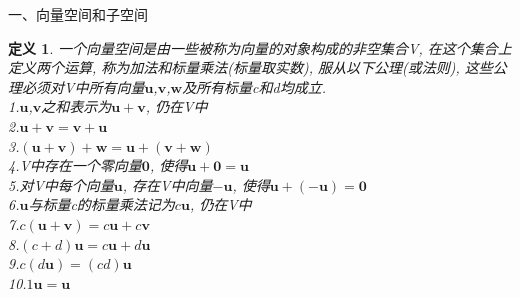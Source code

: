 \documentclass[UTF8, fontset=ubuntu]{ctexart}
\theoremstyle{nonumberplain}
\newtheorem{definition}{定义}
\theoremstyle{plain}
\begin{document}
一、向量空间和子空间\\[-3ex]
\begin{definition}
一个向量空间是由一些被称为向量的对象构成的非空集合V, 在这个集合上定义两个运算, 称为加法和标量乘法(标量取实数), 服从以下公理(或法则), 这些公理必须对V中所有向量$\mathbf{u}$,$\mathbf{v}$,$\mathbf{w}$及所有标量c和d均成立.\\
1.\quad$\mathbf{u}$,$\mathbf{v}$之和表示为$\mathbf{u}+\mathbf{v}$, 仍在V中\\
2.\quad$\mathbf{u+v=v+u}$\\
3.\quad$\mathbf{(u+v)+w=u+(v+w)}$\\
4.\quad V中存在一个零向量$\mathbf{0}$, 使得$\mathbf{u+0=u}$\\
5.\quad 对V中每个向量$\mathbf{u}$, 存在V中向量$-\mathbf{u}$, 使得$\mathbf{u+(-u)=0}$\\
6.\quad$\mathbf{u}$与标量c的标量乘法记为$c\mathbf{u}$, 仍在V中\\
7.\quad$c\mathbf{(u+v)}=c\mathbf{u}+c\mathbf{v}$\\
8.\quad$(c+d)\mathbf{u}=c\mathbf{u}+d\mathbf{u}$\\
9.\quad$c(d\mathbf{u})=(cd)\mathbf{u}$\\
10.\quad$1\mathbf{u=u}$\\
\end{definition}
\end{document}

